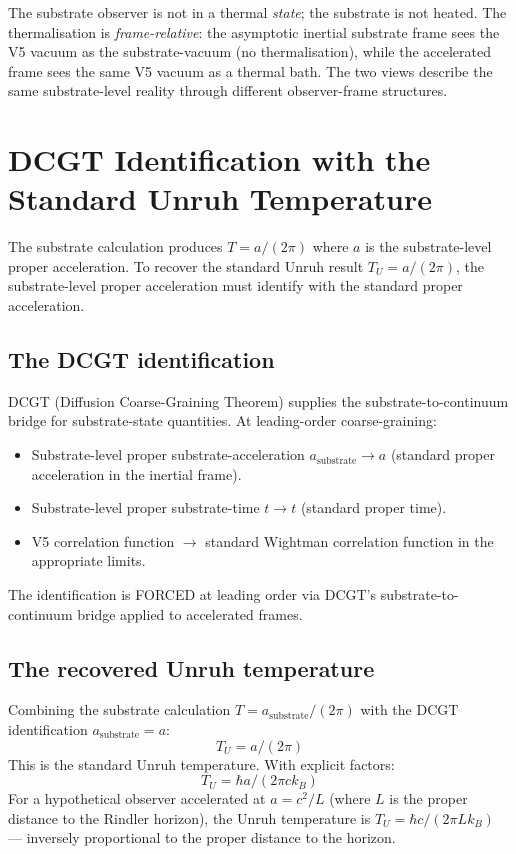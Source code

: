 \documentclass[11pt,a4paper]{article}
\begin{document}
The substrate observer is not in a thermal \emph{state}; the substrate is not heated. The thermalisation is \emph{frame-relative}: the asymptotic inertial substrate frame sees the V5 vacuum as the substrate-vacuum (no thermalisation), while the accelerated frame sees the same V5 vacuum as a thermal bath. The two views describe the same substrate-level reality through different observer-frame structures.

\section{DCGT Identification with the Standard Unruh Temperature}

The substrate calculation produces $T = a/(2\pi)$ where $a$ is the substrate-level proper acceleration. To recover the standard Unruh result $T_U = a/(2\pi)$, the substrate-level proper acceleration must identify with the standard proper acceleration.

\subsection{The DCGT identification}

DCGT (Diffusion Coarse-Graining Theorem) supplies the substrate-to-continuum bridge for substrate-state quantities. At leading-order coarse-graining:

\begin{itemize}[noitemsep]
\item Substrate-level proper substrate-acceleration $a_{\mathrm{substrate}} \to a$ (standard proper acceleration in the inertial frame).
\item Substrate-level proper substrate-time $t \to t$ (standard proper time).
\item V5 correlation function $\to$ standard Wightman correlation function in the appropriate limits.
\end{itemize}

The identification is FORCED at leading order via DCGT's substrate-to-continuum bridge applied to accelerated frames.

\subsection{The recovered Unruh temperature}

Combining the substrate calculation $T = a_{\mathrm{substrate}}/(2\pi)$ with the DCGT identification $a_{\mathrm{substrate}} = a$:
\[
T_U = a / (2\pi)
\]
This is the standard Unruh temperature. With explicit factors:
\[
T_U = \hbar a / (2\pi c k_B)
\]
For a hypothetical observer accelerated at $a = c^{2}/L$ (where $L$ is the proper distance to the Rindler horizon), the Unruh temperature is $T_U = \hbar c/(2\pi L k_B)$ --- inversely proportional to the proper distance to the horizon.
\end{document}

